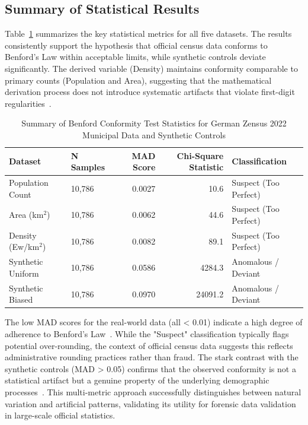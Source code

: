 \documentclass[11pt,a4paper]{article}
\begin{document}
\subsection{Summary of Statistical Results}

Table~\ref{tab:benford_summary} summarizes the key statistical metrics for all five datasets. The results consistently support the hypothesis that official census data conforms to Benford's Law within acceptable limits, while synthetic controls deviate significantly. The derived variable (Density) maintains conformity comparable to primary counts (Population and Area), suggesting that the mathematical derivation process does not introduce systematic artifacts that violate first-digit regularities~\cite{Morales2022BenfordsLF}.

\begin{table}[ht]
\caption{Summary of Benford Conformity Test Statistics for German Zensus 2022 Municipal Data and Synthetic Controls}
\label{tab:benford_summary}
\centering
\begin{tabular}{@{}llrrl@{}}
\toprule
Dataset & N Samples & MAD Score & Chi-Square Statistic & Classification \\
\midrule
Population Count & 10,786 & 0.0027 & 10.6 & Suspect (Too Perfect) \\
Area (km$^2$) & 10,786 & 0.0062 & 44.6 & Suspect (Too Perfect) \\
Density (Ew/km$^2$) & 10,786 & 0.0082 & 89.1 & Suspect (Too Perfect) \\
Synthetic Uniform & 10,786 & 0.0586 & 4284.3 & Anomalous / Deviant \\
Synthetic Biased & 10,786 & 0.0970 & 24091.2 & Anomalous / Deviant \\
\bottomrule
\end{tabular}
\end{table}

The low MAD scores for the real-world data (all < 0.01) indicate a high degree of adherence to Benford's Law~\cite{Azevedo2021ABL}. While the "Suspect" classification typically flags potential over-rounding, the context of official census data suggests this reflects administrative rounding practices rather than fraud. The stark contrast with the synthetic controls (MAD > 0.05) confirms that the observed conformity is not a statistical artifact but a genuine property of the underlying demographic processes~\cite{Petras2025DetectingBL}. This multi-metric approach successfully distinguishes between natural variation and artificial patterns, validating its utility for forensic data validation in large-scale official statistics.
\end{document}
